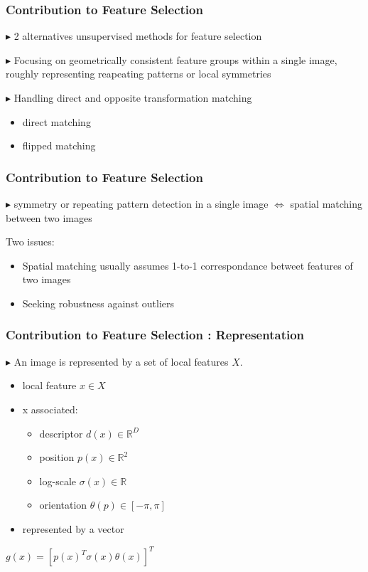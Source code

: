 \documentclass[11pt]{beamer}
\begin{document}
\begin{frame}
\frametitle{Contribution to Feature Selection}
$\blacktriangleright$ 2 alternatives unsupervised methods for feature selection

\vspace{0.3cm}

$\blacktriangleright$ Focusing on geometrically consistent feature groups within a single image, roughly representing reapeating patterns or local symmetries

\vspace{0.3cm}

$\blacktriangleright$ Handling direct and opposite transformation matching
\begin{itemize}
\item direct matching
\item flipped matching
\end{itemize}
\end{frame}

\begin{frame}
\frametitle{Contribution to Feature Selection}
$\blacktriangleright$ symmetry or repeating pattern detection in a single image \newline{} $\Leftrightarrow$ spatial matching between two images

\vspace{0.3cm}
Two issues:
\begin{itemize}
\item Spatial matching usually assumes 1-to-1 correspondance betweet features of two images
\item Seeking robustness against outliers
\end{itemize}
\end{frame}

\begin{frame}
\frametitle{Contribution to Feature Selection : Representation}

$\blacktriangleright$ An image is represented by a set of local features $X$.

\begin{itemize}
\item local feature $x \in X$ 
\item x associated:
\begin{itemize}
\item descriptor $d(x) \in \mathbb{R}^D$
\item position $p(x) \in \mathbb{R}^2$
\item log-scale $\sigma(x) \in \mathbb{R}$
\item orientation $\theta(p) \in [-\pi, \pi]$ 
\end{itemize}
\item represented by a vector
\end{itemize}
\begin{center}
$g(x) = [p(x)^T \sigma(x) \theta(x)]^T$
\end{center}
\end{frame}
\end{document}
